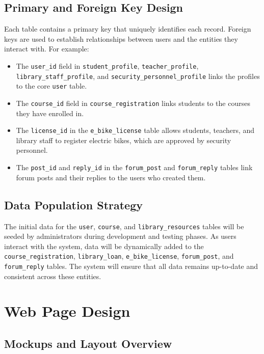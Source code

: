 \documentclass[12pt]{article}
\begin{document}
\subsection{Primary and Foreign Key Design}
Each table contains a primary key that uniquely identifies each record. Foreign keys are used to establish relationships between users and the entities they interact with. For example:
\begin{itemize}
    \item The \texttt{user\_id} field in \texttt{student\_profile}, \texttt{teacher\_profile}, \texttt{library\_staff\_profile}, and \texttt{security\_personnel\_profile} links the profiles to the core \texttt{user} table.
    \item The \texttt{course\_id} field in \texttt{course\_registration} links students to the courses they have enrolled in.
    \item The \texttt{license\_id} in the \texttt{e\_bike\_license} table allows students, teachers, and library staff to register electric bikes, which are approved by security personnel.
    \item The \texttt{post\_id} and \texttt{reply\_id} in the \texttt{forum\_post} and \texttt{forum\_reply} tables link forum posts and their replies to the users who created them.
\end{itemize}

\subsection{Data Population Strategy}
The initial data for the \texttt{user}, \texttt{course}, and \texttt{library\_resources} tables will be seeded by administrators during development and testing phases. As users interact with the system, data will be dynamically added to the \texttt{course\_registration}, \texttt{library\_loan}, \texttt{e\_bike\_license}, \texttt{forum\_post}, and \texttt{forum\_reply} tables. The system will ensure that all data remains up-to-date and consistent across these entities.

\newpage
\section{Web Page Design}
\subsection{Mockups and Layout Overview}
\end{document}
